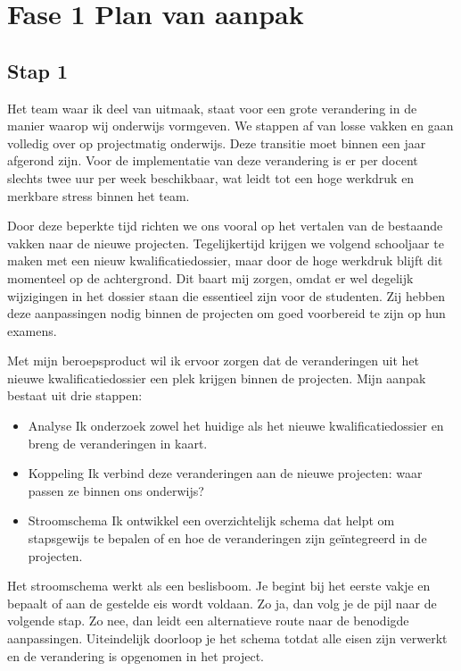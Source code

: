 \chapter{Fase 1 Plan van aanpak}
\section{Stap 1}

Het team waar ik deel van uitmaak, staat voor een grote verandering in de manier waarop wij onderwijs vormgeven. We stappen af van losse vakken en gaan volledig over op projectmatig onderwijs. Deze transitie moet binnen een jaar afgerond zijn. Voor de implementatie van deze verandering is er per docent slechts twee uur per week beschikbaar, wat leidt tot een hoge werkdruk en merkbare stress binnen het team.

Door deze beperkte tijd richten we ons vooral op het vertalen van de bestaande vakken naar de nieuwe projecten. Tegelijkertijd krijgen we volgend schooljaar te maken met een nieuw kwalificatiedossier, maar door de hoge werkdruk blijft dit momenteel op de achtergrond. Dit baart mij zorgen, omdat er wel degelijk wijzigingen in het dossier staan die essentieel zijn voor de studenten. Zij hebben deze aanpassingen nodig binnen de projecten om goed voorbereid te zijn op hun examens.

Met mijn beroepsproduct wil ik ervoor zorgen dat de veranderingen uit het nieuwe kwalificatiedossier een plek krijgen binnen de projecten. Mijn aanpak bestaat uit drie stappen:
\begin{itemize}
    \item Analyse  Ik onderzoek zowel het huidige als het nieuwe kwalificatiedossier en breng de veranderingen in kaart.
    \item Koppeling  Ik verbind deze veranderingen aan de nieuwe projecten: waar passen ze binnen ons onderwijs?
    \item Stroomschema  Ik ontwikkel een overzichtelijk schema dat helpt om stapsgewijs te bepalen of en hoe de veranderingen zijn geïntegreerd in de projecten.
\end{itemize}


Het stroomschema werkt als een beslisboom. Je begint bij het eerste vakje en bepaalt of aan de gestelde eis wordt voldaan. Zo ja, dan volg je de pijl naar de volgende stap. Zo nee, dan leidt een alternatieve route naar de benodigde aanpassingen. Uiteindelijk doorloop je het schema totdat alle eisen zijn verwerkt en de verandering is opgenomen in het project.


